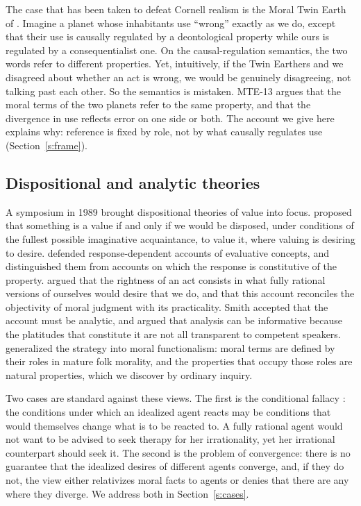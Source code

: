 \documentclass{situationist-preprint}
\begin{document}
The case that has been taken to defeat Cornell realism is the Moral Twin Earth of \citet{HorganTimmons1991}. Imagine a planet whose inhabitants use \enquote{wrong} exactly as we do, except that their use is causally regulated by a deontological property while ours is regulated by a consequentialist one. On the causal-regulation semantics, the two words refer to different properties. Yet, intuitively, if the Twin Earthers and we disagreed about whether an act is wrong, we would be genuinely disagreeing, not talking past each other. So the semantics is mistaken. MTE-13 argues that the moral terms of the two planets refer to the same property, and that the divergence in use reflects error on one side or both. The account we give here explains why: reference is fixed by role, not by what causally regulates use (Section~\ref{s:frame}).

\subsection{Dispositional and analytic theories}

A symposium in 1989 brought dispositional theories of value into focus. \citet{Lewis1989} proposed that something is a value if and only if we would be disposed, under conditions of the fullest possible imaginative acquaintance, to value it, where valuing is desiring to desire. \citet{Johnston1989} defended response-dependent accounts of evaluative concepts, and distinguished them from accounts on which the response is constitutive of the property. \citet{Smith1994} argued that the rightness of an act consists in what fully rational versions of ourselves would desire that we do, and that this account reconciles the objectivity of moral judgment with its practicality. Smith accepted that the account must be analytic, and argued that analysis can be informative because the platitudes that constitute it are not all transparent to competent speakers. \citet{Jackson1998} generalized the strategy into moral functionalism: moral terms are defined by their roles in mature folk morality, and the properties that occupy those roles are natural properties, which we discover by ordinary inquiry.

Two cases are standard against these views. The first is the conditional fallacy \citep{Shope1978}: the conditions under which an idealized agent reacts may be conditions that would themselves change what is to be reacted to. A fully rational agent would not want to be advised to seek therapy for her irrationality, yet her irrational counterpart should seek it. The second is the problem of convergence: there is no guarantee that the idealized desires of different agents converge, and, if they do not, the view either relativizes moral facts to agents or denies that there are any where they diverge. We address both in Section~\ref{s:cases}.
\end{document}
